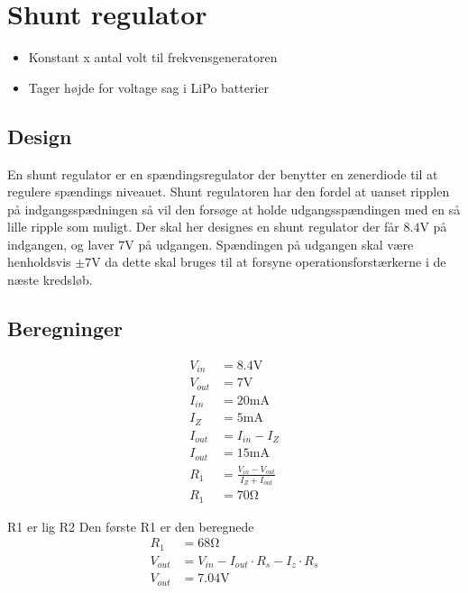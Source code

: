 \section{Shunt regulator}\label{sec:shunt}



\begin{itemize}
	\item Konstant x antal volt til frekvensgeneratoren
	\item Tager højde for voltage sag i LiPo batterier
\end{itemize}


\subsection{Design}
En shunt regulator er en spændingsregulator der benytter en zenerdiode til at regulere spændings niveauet.
Shunt regulatoren har den fordel at uanset ripplen på indgangsspædningen så vil den forsøge at holde udgangsspændingen med en så lille ripple som muligt.
Der skal her designes en shunt regulator der får $8.4 \si{\volt}$ på indgangen, og laver $7 \si{\volt}$ på udgangen.
Spændingen på udgangen skal være henholdsvis $\pm 7 \si{\volt}$ da dette skal bruges til at forsyne operationsforstærkerne i de næste kredsløb.

\subsection{Beregninger}


\begin{align}
	V_{in} & = 8.4 \si{\volt} \nonumber \\
	V_{out} & = 7 \si{\volt} \nonumber \\
	I_{in} & = 20\si{\milli\ampere} \nonumber \\
	I_Z & = 5 \si{\milli\ampere} \nonumber \\
	I_{out} & = I_{in} - I_Z \\
	I_{out} & = 15 \si{\milli\ampere} \nonumber \\
	R_1 & = \frac{V_{in} - V_{out}}{I_Z + I_{out}} \label{eq:RegulatorModstand} \\
	R_1 & = 70 \si{\ohm} \nonumber \label{eq:RegulatorModstandBeregnet}
\end{align}

R1 er lig R2
Den første R1 er den beregnede
\begin{align}
	R_1 & = 68 \si{\ohm} \nonumber \\
	V_{out} & = V_{in} - I_{out} \cdot R_s - I_z \cdot R_s \\
	V_{out} & = 7.04 \si{\volt} \label{eq:RegulatorBeregnetPotentiale} 
\end{align}